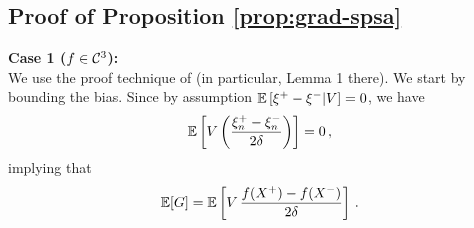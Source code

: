 

%
%
%
%

\subsection{Proof of Proposition \ref{prop:grad-spsa}}
\textbf{Case 1 ($f \in \mathcal{C}^3$):}\ \\
We use the proof technique of \cite{spall1992multivariate}
  (in particular, Lemma 1 there).
We start by bounding the bias.
Since by assumption $\mathbb{E}\left[ \xi^+-\xi^-|V\right]=0$, we have
\begin{align*}
\mathbb{E}\left[  V\left(\dfrac{\xi_n^+ - \xi_n^-}{2\delta}\right) \right]= 0\,,
\end{align*}
implying that
\begin{align*}
\mathbb{E}[G] =  \mathbb{E}\left[V\,  \dfrac{f(X^+)  -f(X^-)}{2\delta} \right]\,.
\end{align*}

